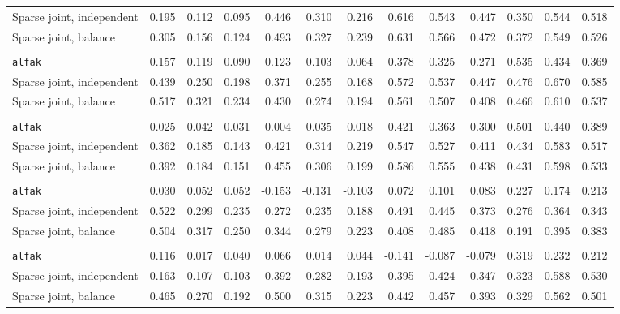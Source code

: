 \begin{center}
\begin{tabular}{l*{12}{r}}
\quad Sparse joint, independent & 0.195 & 0.112 & 0.095 & 0.446 & 0.310 & 0.216 & 0.616 & 0.543 & 0.447 & 0.350 & 0.544 & 0.518 \\
\quad Sparse joint, balance & 0.305 & 0.156 & 0.124 & 0.493 & 0.327 & 0.239 & 0.631 & 0.566 & 0.472 & 0.372 & 0.549 & 0.526 \\
\addlinespace[2pt]
\multicolumn{13}{l}{\textit{500/700, 1080 d}} \\
\quad \texttt{alfak} & 0.157 & 0.119 & 0.090 & 0.123 & 0.103 & 0.064 & 0.378 & 0.325 & 0.271 & 0.535 & 0.434 & 0.369 \\
\quad Sparse joint, independent & 0.439 & 0.250 & 0.198 & 0.371 & 0.255 & 0.168 & 0.572 & 0.537 & 0.447 & 0.476 & 0.670 & 0.585 \\
\quad Sparse joint, balance & 0.517 & 0.321 & 0.234 & 0.430 & 0.274 & 0.194 & 0.561 & 0.507 & 0.408 & 0.466 & 0.610 & 0.537 \\
\addlinespace[2pt]
\multicolumn{13}{l}{\textit{500/700, bottleneck}} \\
\quad \texttt{alfak} & 0.025 & 0.042 & 0.031 & 0.004 & 0.035 & 0.018 & 0.421 & 0.363 & 0.300 & 0.501 & 0.440 & 0.389 \\
\quad Sparse joint, independent & 0.362 & 0.185 & 0.143 & 0.421 & 0.314 & 0.219 & 0.547 & 0.527 & 0.411 & 0.434 & 0.583 & 0.517 \\
\quad Sparse joint, balance & 0.392 & 0.184 & 0.151 & 0.455 & 0.306 & 0.199 & 0.586 & 0.555 & 0.438 & 0.431 & 0.598 & 0.533 \\
\addlinespace[2pt]
\multicolumn{13}{l}{\textit{100/3000, 360 d}} \\
\quad \texttt{alfak} & 0.030 & 0.052 & 0.052 & -0.153 & -0.131 & -0.103 & 0.072 & 0.101 & 0.083 & 0.227 & 0.174 & 0.213 \\
\quad Sparse joint, independent & 0.522 & 0.299 & 0.235 & 0.272 & 0.235 & 0.188 & 0.491 & 0.445 & 0.373 & 0.276 & 0.364 & 0.343 \\
\quad Sparse joint, balance & 0.504 & 0.317 & 0.250 & 0.344 & 0.279 & 0.223 & 0.408 & 0.485 & 0.418 & 0.191 & 0.395 & 0.383 \\
\addlinespace[2pt]
\multicolumn{13}{l}{\textit{3000/100, 360 d}} \\
\quad \texttt{alfak} & 0.116 & 0.017 & 0.040 & 0.066 & 0.014 & 0.044 & -0.141 & -0.087 & -0.079 & 0.319 & 0.232 & 0.212 \\
\quad Sparse joint, independent & 0.163 & 0.107 & 0.103 & 0.392 & 0.282 & 0.193 & 0.395 & 0.424 & 0.347 & 0.323 & 0.588 & 0.530 \\
\quad Sparse joint, balance & 0.465 & 0.270 & 0.192 & 0.500 & 0.315 & 0.223 & 0.442 & 0.457 & 0.393 & 0.329 & 0.562 & 0.501 \\
\bottomrule
\end{tabular}
\end{center}

